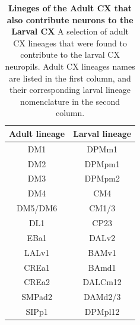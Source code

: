         \begin{table} [H]
        \centering
        \begin{tabular}{|c|c|}
        \hline
        Adult lineage & Larval lineage \\
        \hline
        DM1 & DPMm1 \\
        DM2 & DPMpm1 \\
        DM3 & DPMpm2 \\
        DM4 & CM4 \\
        DM5/DM6 & CM1/3 \\
        DL1 & CP23 \\
        EBa1 & DALv2 \\
        LALv1 & BAMv1 \\
        CREa1 & BAmd1 \\
        CREa2 & DALCm12 \\
        SMPad2 & DAMd2/3 \\
        SIPp1 & DPMpl12 \\
        \bottomrule
        \end{tabular}
        \caption[Lineges of the Adult CX that also contribute neurons to the Larval CX]{\textbf{Lineges of the Adult CX that also contribute neurons to the Larval CX} A selection of adult CX lineages that were found to contribute to the larval CX neuropils.  Adult CX lineages names are listed in the first column, and their corresponding larval lineage nomenclature in the second column\citep{eckstein2024neurotransmitter}.}
        \label{lineagemap}
        \end{table}
